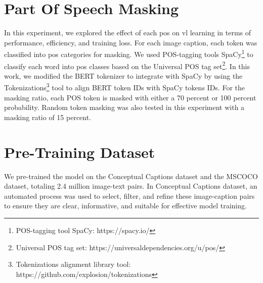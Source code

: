 \section{Part Of Speech Masking}
In this experiment, we explored the effect of each \acrshort{pos} on \acrshort{vl} learning in terms of performance, efficiency, and training loss.  
For each image caption, each token was classified into \acrshort{pos} categories for masking.  
We used POS-tagging tools SpaCy\footnote{POS-tagging tool SpaCy: https://spacy.io/} to classify each word into \acrshort{pos} classes based on the Universal POS tag set\footnote{Universal POS tag set: https://universaldependencies.org/u/pos/}.
In this work, we modified the BERT tokenizer to integrate with SpaCy by using the Tokenizations\footnote{Tokenizations alignment library tool: https://github.com/explosion/tokenizations} tool to align BERT token IDs with SpaCy tokens IDs.
For the masking ratio, each POS token is masked with either a 70 percent or 100 percent probability.
Random token masking was also tested in this experiment with a masking ratio of 15 percent.

\section{Pre-Training Dataset}
We pre-trained the model on the Conceptual Captions dataset \cite{conceptual-caption} and the MSCOCO dataset, totaling 2.4 million image-text pairs.
In Conceptual Captions dataset, an automated process was used to select, filter, and refine these image-caption pairs to ensure they are clear, informative, and suitable for effective model training.


